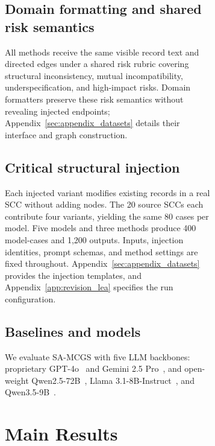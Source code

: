 \documentclass[11pt]{article}
\newcommand{\samcgs}{SA-MCGS}
\newcommand{\scc}{SCC}
\begin{document}
\begin{figure}[!t]
\begin{figure}[!t]


\subsection{Domain formatting and shared risk semantics}



All methods receive the same visible record text and directed edges under a shared risk rubric covering structural inconsistency, mutual incompatibility, underspecification, and high-impact risks. Domain formatters preserve these risk semantics without revealing injected endpoints; Appendix~\ref{sec:appendix_datasets} details their interface and graph construction.

\subsection{Critical structural injection}

Each injected variant modifies existing records in a real \scc{} without adding nodes. The 20 source \scc{}s each contribute four variants, yielding the same 80 cases per model. Five models and three methods produce 400 model-cases and 1,200 outputs. Inputs, injection identities, prompt schemas, and method settings are fixed throughout. Appendix~\ref{sec:appendix_datasets} provides the injection templates, and Appendix~\ref{app:revision_lea} specifies the run configuration.

\subsection{Baselines and models}




We evaluate \samcgs{} with five LLM backbones: proprietary GPT-4o~\citep{openai2024gpt4o} and Gemini 2.5 Pro~\citep{comanici2025gemini25}, and open-weight Qwen2.5-72B~\citep{qwen2024qwen25}, Llama 3.1-8B-Instruct~\citep{grattafiori2024llama3}, and Qwen3.5-9B~\citep{qwen2026qwen35nine}.

\section{Main Results}
\label{sec:results}




\end{figure}
\end{figure}
\end{document}
